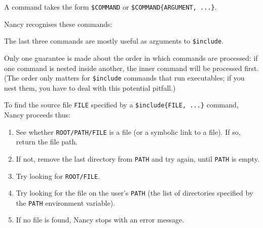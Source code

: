 \documentclass[a4paper,english]{scrartcl}
\begin{document}
A command takes the form \verb|$COMMAND| or \verb|$COMMAND{ARGUMENT, ...}|.

Nancy recognises these commands:


The last three commands are mostly useful as arguments to \verb|$include|.

Only one guarantee is made about the order in which commands are processed: if one command is nested inside another, the inner command will be processed first. (The order only matters for \verb|$include| commands that run executables; if you nest them, you have to deal with this potential pitfall.)

To find the source file \verb|FILE| specified by a \verb|$include{FILE, ...}| command, Nancy proceeds thus:

\begin{enumerate}
\item See whether \verb|ROOT/PATH/FILE| is a file (or a symbolic link to a file). If so, return the file path.
\item If not, remove the last directory from \verb|PATH| and try again, until \verb|PATH| is empty.
\item Try looking for \verb|ROOT/FILE|.
\item Try looking for the file on the user’s \verb|PATH| (the list of directories specified by the \verb|PATH| environment variable).
\item If no file is found, Nancy stops with an error message.
\end{enumerate}
\end{document}
